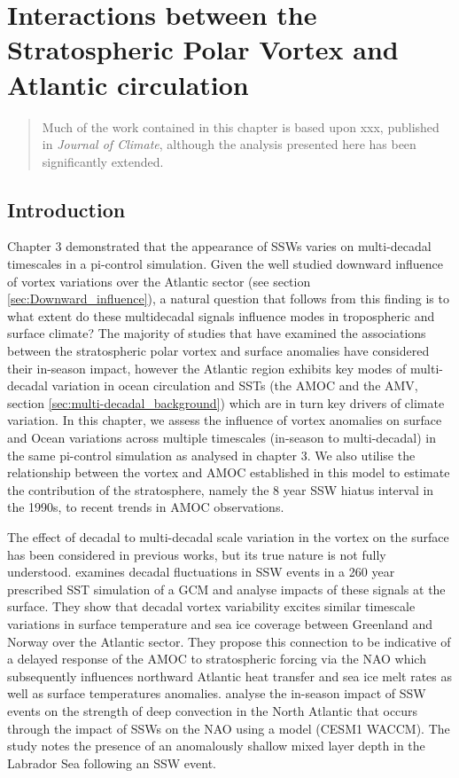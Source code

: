 \chapter{Interactions between the Stratospheric Polar Vortex and Atlantic circulation} 
\begin{quotation}
  Much of the work contained in this chapter is based upon xxx,
  published in \emph{Journal of Climate}, although the analysis
  presented here has been significantly extended.
\end{quotation}

\label{cha:moments}


\section{Introduction}
Chapter 3 demonstrated that the appearance of SSWs varies on multi-decadal timescales in a pi-control simulation. Given the well studied downward influence of vortex variations over the Atlantic sector (see section \ref{sec:Downward_influence}), a natural question that follows from this finding is to what extent do these multidecadal signals influence modes in tropospheric and surface climate? The majority of studies that have examined the associations between the stratospheric polar vortex and surface anomalies have considered their in-season impact, however the Atlantic region exhibits key modes of multi-decadal variation in ocean circulation and SSTs (the AMOC and the AMV, section \ref{sec:multi-decadal_background}) which are in turn key drivers of climate variation. In this chapter, we assess the influence of vortex anomalies on surface and Ocean variations across multiple timescales (in-season to multi-decadal)
in the same pi-control simulation as analysed in chapter 3. We also utilise the relationship between the vortex and AMOC established in this model to estimate the contribution of the stratosphere, namely the 8 year SSW hiatus interval in the 1990s, to recent trends in AMOC observations.

The effect of decadal to multi-decadal scale variation in the vortex on the surface has been considered in previous works, but its true nature is not fully understood. \cite{manziniStratospheretroposphere2012} examines decadal fluctuations in SSW events in a 260 year prescribed SST simulation of a GCM and analyse impacts of these signals at the surface. They show that decadal vortex variability excites similar timescale variations in surface temperature and sea ice coverage between Greenland and Norway over the Atlantic sector. They propose this connection to be indicative of a delayed response of the AMOC to stratospheric forcing via the NAO which  subsequently influences northward Atlantic heat transfer and sea ice melt rates as well as surface temperatures anomalies. \cite{haaseImportance2018} analyse the in-season impact of SSW events on the strength of deep convection in the North Atlantic that occurs through the impact of SSWs on the NAO using a model (CESM1 WACCM). The study notes the presence of an anomalously shallow  mixed layer depth in the Labrador Sea following an SSW event. 

